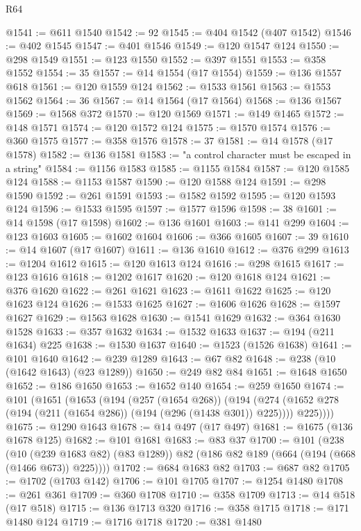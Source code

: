 \begin{lexlean}{R64}
\begin{coremodule}
@1541 := @611 @1540
@1542 := 92
@1545 := @404 @1542 (@407 @1542)
@1546 := @402 @1545
@1547 := @401 @1546
@1549 := @120 @1547 @124
@1550 := @298 @1549
@1551 := @123 @1550
@1552 := @397 @1551
@1553 := @358 @1552
@1554 := 35
@1557 := @14 @1554 (@17 @1554)
@1559 := @136 @1557 @618
@1561 := @120 @1559 @124
@1562 := @1533 @1561
@1563 := @1553 @1562
@1564 := 36
@1567 := @14 @1564 (@17 @1564)
@1568 := @136 @1567
@1569 := @1568 @372
@1570 := @120 @1569
@1571 := @149 @1465
@1572 := @148 @1571
@1574 := @120 @1572 @124
@1575 := @1570 @1574
@1576 := @360 @1575
@1577 := @358 @1576
@1578 := 37
@1581 := @14 @1578 (@17 @1578)
@1582 := @136 @1581
@1583 := "a control character must be escaped in a string"
@1584 := @1156 @1583
@1585 := @1155 @1584
@1587 := @120 @1585 @124
@1588 := @1153 @1587
@1590 := @120 @1588 @124
@1591 := @298 @1590
@1592 := @261 @1591
@1593 := @1582 @1592
@1595 := @120 @1593 @124
@1596 := @1533 @1595
@1597 := @1577 @1596
@1598 := 38
@1601 := @14 @1598 (@17 @1598)
@1602 := @136 @1601
@1603 := @141 @299
@1604 := @123 @1603
@1605 := @1602 @1604
@1606 := @366 @1605
@1607 := 39
@1610 := @14 @1607 (@17 @1607)
@1611 := @136 @1610
@1612 := @376 @299
@1613 := @1204 @1612
@1615 := @120 @1613 @124
@1616 := @298 @1615
@1617 := @123 @1616
@1618 := @1202 @1617
@1620 := @120 @1618 @124
@1621 := @376 @1620
@1622 := @261 @1621
@1623 := @1611 @1622
@1625 := @120 @1623 @124
@1626 := @1533 @1625
@1627 := @1606 @1626
@1628 := @1597 @1627
@1629 := @1563 @1628
@1630 := @1541 @1629
@1632 := @364 @1630 @1528
@1633 := @357 @1632
@1634 := @1532 @1633
@1637 := @194 (@211 @1634) @225
@1638 := @1530 @1637
@1640 := @1523 (@1526 @1638)
@1641 := @101 @1640
@1642 := @239 @1289
@1643 := @67 @82
@1648 := @238 (@10 (@1642 @1643) (@23 @1289))
@1650 := @249 @82 @84
@1651 := @1648 @1650
@1652 := @186 @1650
@1653 := @1652 @140
@1654 := @259 @1650
@1674 := @101
    (@1651
      (@1653
        (@194
          (@257 (@1654 @268))
          (@194
            (@274 (@1652 @278 (@194 (@211 (@1654 @286)) (@194 (@296 (@1438 @301)) @225))))
            @225))))
@1675 := @1290 @1643
@1678 := @14 @497 (@17 @497)
@1681 := @1675 (@136 @1678 @125)
@1682 := @101 @1681
@1683 := @83 @37
@1700 := @101
    (@238
      (@10 (@239 @1683 @82) (@83 @1289))
      @82
      (@186 @82 @189 (@664 (@194 (@668 (@1466 @673)) @225))))
@1702 := @684 @1683 @82
@1703 := @687 @82
@1705 := @1702 (@1703 @142)
@1706 := @101 @1705
@1707 := @1254 @1480
@1708 := @261 @361
@1709 := @360 @1708
@1710 := @358 @1709
@1713 := @14 @518 (@17 @518)
@1715 := @136 @1713 @320
@1716 := @358 @1715
@1718 := @171 @1480 @124
@1719 := @1716 @1718
@1720 := @381 @1480

\end{coremodule}
\end{lexlean}
